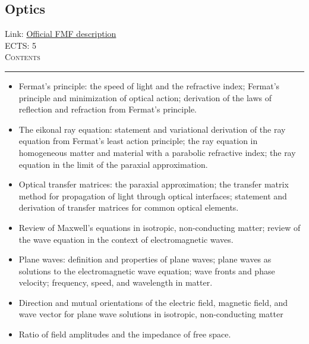 \documentclass[11pt, a4paper]{article}
\newenvironment{course}[3]{
\subsection{#1}%
Link: \href{#2}{Official FMF description}\\%
ECTS: #3%
\vspace{1ex}
\\
{\large \textsc{Contents}}\\[-0.9ex]%
\rule{\textwidth}{0.5pt}
\vspace{-3ex}
}
{}
\newenvironment{chapter}[1]{
\begin{tcolorbox}[title=#1, breakable]
}
{\end{tcolorbox}}
\begin{document}
\begin{course}{Optics}{https://www.fmf.uni-lj.si/en/study-physics/programmes/1fiz/2020/7000777/courses/1165/}{5}
    \label{optics}

    \begin{chapter}{Review of geometrical optics}
        \begin{itemize}
        
            \item Fermat's principle: the speed of light and the refractive index; Fermat's principle and minimization of optical action; derivation of the laws of reflection and refraction from Fermat's principle.

            \item The eikonal ray equation: statement and variational derivation of the ray equation from Fermat's least action principle; the ray equation in homogeneous matter and material with a parabolic refractive index; the ray equation in the limit of the paraxial approximation.

            \item Optical transfer matrices: the paraxial approximation; the transfer matrix method for propagation of light through optical interfaces; statement and derivation of transfer matrices for common optical elements.
        
        \end{itemize}
    \end{chapter}

    \begin{chapter}{Fundamentals of wave optics}
        \begin{itemize}
        
            \item Review of Maxwell's equations in isotropic, non-conducting matter; review of the wave equation in the context of electromagnetic waves.

            \item Plane waves: definition and properties of plane waves; plane waves as solutions to the electromagnetic wave equation; wave fronts and phase velocity; frequency, speed, and wavelength in matter.

            \item Direction and mutual orientations of the electric field, magnetic field, and wave vector for plane wave solutions in isotropic, non-conducting matter

            \item Ratio of field amplitudes and the impedance of free space.


\end{itemize}
\end{chapter}
\end{course}
\end{document}
